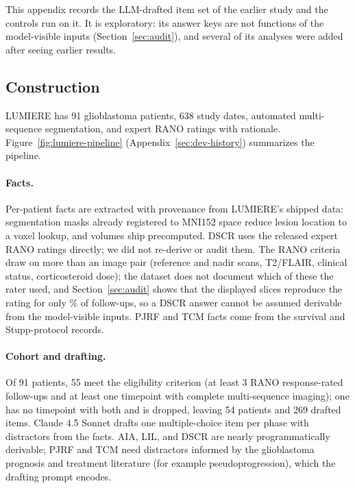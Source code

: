 \documentclass[11pt]{article}
\begin{document}
This appendix records the LLM-drafted item set of the earlier study and the controls run on it. It is exploratory: its answer keys are not functions of the model-visible inputs (Section~\ref{sec:audit}), and several of its analyses were added after seeing earlier results.

\subsection{Construction}
\label{sec:app-v3-construction}

LUMIERE \citep{suter2022lumiere} has 91 glioblastoma patients, 638 study dates, automated multi-sequence segmentation, and expert RANO ratings with rationale. Figure~\ref{fig:lumiere-pipeline} (Appendix~\ref{sec:dev-history}) summarizes the pipeline.

\paragraph{Facts.} Per-patient facts are extracted with provenance from LUMIERE's shipped data: segmentation masks already registered to MNI152 space reduce lesion location to a voxel lookup, and volumes ship precomputed. DSCR uses the released expert RANO ratings directly; we did not re-derive or audit them. The RANO criteria \citep{wen2010updated} draw on more than an image pair (reference and nadir scans, T2/FLAIR, clinical status, corticosteroid dose); the dataset does not document which of these the rater used, and Section~\ref{sec:audit} shows that the displayed slices reproduce the rating for only \vfourConcordantPct{}\% of follow-ups, so a DSCR answer cannot be assumed derivable from the model-visible inputs. PJRF and TCM facts come from the survival and Stupp-protocol records.

\paragraph{Cohort and drafting.} Of 91 patients, 55 meet the eligibility criterion (at least 3 RANO response-rated follow-ups and at least one timepoint with complete multi-sequence imaging); one has no timepoint with both and is dropped, leaving 54 patients and 269 drafted items. Claude 4.5 Sonnet drafts one multiple-choice item per phase with distractors from the facts. AIA, LIL, and DSCR are nearly programmatically derivable; PJRF and TCM need distractors informed by the glioblastoma prognosis and treatment literature (for example pseudoprogression), which the drafting prompt encodes.
\end{document}

